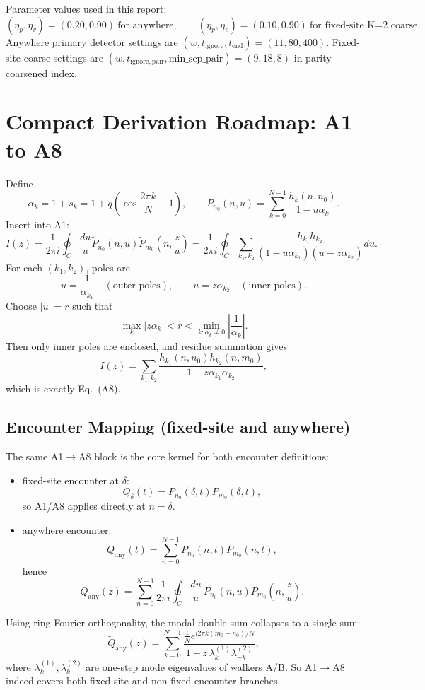 \documentclass[11pt]{article}
\begin{document}
Parameter values used in this report:
\[
(\eta_p,\eta_v)=(0.20,0.90)\ \text{for anywhere},\qquad
(\eta_p,\eta_v)=(0.10,0.90)\ \text{for fixed-site K=2 coarse}.
\]
Anywhere primary detector settings are $(w,t_{\mathrm{ignore}},t_{\mathrm{end}})=(11,80,400)$.
Fixed-site coarse settings are $(w,t_{\mathrm{ignore,pair}},\mathrm{min\_sep\_pair})=(9,18,8)$ in parity-coarsened index.

\section{Compact Derivation Roadmap: A1 to A8}
Define
\[
\alpha_k=1+s_k=1+q\left(\cos\frac{2\pi k}{N}-1\right),
\qquad
\widetilde P_{n_0}(n,u)=\sum_{k=0}^{N-1}\frac{h_k(n,n_0)}{1-u\alpha_k}.
\]
Insert into A1:
\[
I(z)=\frac{1}{2\pi i}\oint_C\frac{du}{u}
\widetilde P_{n_0}(n,u)\widetilde P_{m_0}\!\left(n,\frac{z}{u}\right)
=\frac{1}{2\pi i}\oint_C\sum_{k_1,k_2}
\frac{h_{k_1}h_{k_2}}{(1-u\alpha_{k_1})(u-z\alpha_{k_2})}du.
\]
For each $(k_1,k_2)$, poles are
\[
u=\frac1{\alpha_{k_1}}\quad(\text{outer poles}),
\qquad
u=z\alpha_{k_2}\quad(\text{inner poles}).
\]
Choose $|u|=r$ such that
\[
\max_k|z\alpha_k|<r<\min_{k:\alpha_k\neq0}\left|\frac1{\alpha_k}\right|.
\]
Then only inner poles are enclosed, and residue summation gives
\[
I(z)=\sum_{k_1,k_2}
\frac{h_{k_1}(n,n_0)h_{k_2}(n,m_0)}{1-z\alpha_{k_1}\alpha_{k_2}},
\]
which is exactly Eq.~(A8).

\subsection*{Encounter Mapping (fixed-site and anywhere)}
The same A1$\to$A8 block is the core kernel for both encounter definitions:
\begin{itemize}[leftmargin=1.4em]
  \item fixed-site encounter at $\delta$:
  \[
  Q_{\delta}(t)=P_{n_0}(\delta,t)P_{m_0}(\delta,t),
  \]
  so A1/A8 applies directly at $n=\delta$.
  \item anywhere encounter:
  \[
  Q_{\mathrm{any}}(t)=\sum_{n=0}^{N-1}P_{n_0}(n,t)P_{m_0}(n,t),
  \]
  hence
  \[
  \widetilde Q_{\mathrm{any}}(z)=\sum_{n=0}^{N-1}\frac{1}{2\pi i}\oint_C \frac{du}{u}\,
  \widetilde P_{n_0}(n,u)\widetilde P_{m_0}\!\left(n,\frac{z}{u}\right).
  \]
\end{itemize}
Using ring Fourier orthogonality, the modal double sum collapses to a single sum:
\[
\widetilde Q_{\mathrm{any}}(z)=
\sum_{k=0}^{N-1}
\frac{\frac{1}{N}e^{i2\pi k(m_0-n_0)/N}}
{1-z\,\lambda_k^{(1)}\lambda_{-k}^{(2)}},
\]
where $\lambda_k^{(1)},\lambda_k^{(2)}$ are one-step mode eigenvalues of walkers A/B.
So A1$\to$A8 indeed covers both fixed-site and non-fixed encounter branches.
\end{document}

